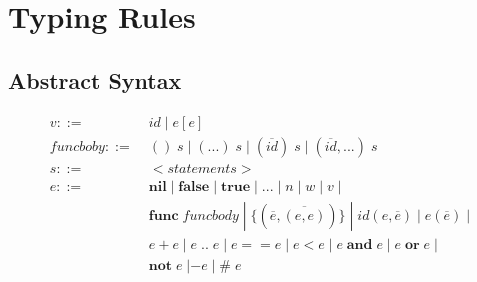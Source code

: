 \documentclass[12pt]{article}
\begin{document}
\section{Typing Rules}

\subsection{Abstract Syntax}

\begin{align*}
v ::= \; & id \; | \; e[e]\\
funcboby ::= \; & () \; s \; | \; ({...}) \; s \;
| \; (\overline{id}) \; s \; | \; (\overline{id},{...}) \; s\\
s ::= \; & {<}statements{>}\\
e ::= \; & \textbf{nil} \; | \; \textbf{false} \; | \; \textbf{true} \;
| \; {...} \; | \; n \; | \; w \; | \; v \; | \\
& \textbf{func} \; funcbody \;
| \; \{(\overline{e},\overline{(e,e)})\} \;
| \; id(e,\overline{e}) \; | \; e(\overline{e}) \; | \\
& e + e \; | \; e \; {..} \; e \; | \; e == e \; | \; e < e \;
| \; e \; \textbf{and} \; e \; | \; e \; \textbf{or} \; e \; | \\
& \textbf{not} \; e \; | - e \; | \; \# \; e
\end{align*}
\end{document}
